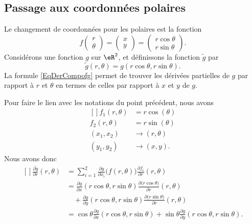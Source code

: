 \subsection{Passage aux coordonnées polaires}

Le changement de coordonnées pour les polaires est la fonction
\begin{equation}
    f\begin{pmatrix}
        r    \\ 
        \theta    
    \end{pmatrix}=\begin{pmatrix}
        x    \\ 
        y    
    \end{pmatrix}=\begin{pmatrix}
        r\cos\theta    \\ 
        r\sin\theta    
    \end{pmatrix}.
\end{equation}
Considérons une fonction $g$ sur $\eR^2$, et définissons la fonction $\tilde g$ par
\begin{equation}
    \tilde g(r,\theta)=g(r\cos\theta,r\sin\theta).
\end{equation}
La formule \eqref{EqDerCompofg} permet de trouver les dérivées partielles de $g$ par rapport à $r$ et $\theta$ en termes de celles par rapport à $x$ et $y$ de $g$.

Pour faire le lien avec les notations du point précédent, nous avons
\begin{equation}
    \begin{aligned}[]
        f_1(r,\theta)&=r\cos(\theta)\\
        f_2(r,\theta)&=r\sin(\theta)\\
        (x_1,x_2)&\to(r,\theta)\\
        (y_1,y_2)&\to(x,y).
    \end{aligned}
\end{equation}
Nous avons donc 
\begin{equation}
    \begin{aligned}[]
        \frac{ \partial \tilde g }{ \partial r }(r,\theta)&=\sum_{i=1}^2\frac{ \partial g }{ \partial x_i }\big( f(r,\theta) \big)\frac{ \partial f_i }{ \partial r }(r,\theta)\\
        &=\frac{ \partial g }{ \partial x }(r\cos\theta,r\sin\theta)\frac{ \partial \big( r\cos\theta \big) }{ \partial r }(r,\theta)\\
        &\quad+\frac{ \partial g }{ \partial y }(r\cos\theta,r\sin\theta)\frac{ \partial \big( r\sin\theta\big) }{ \partial r }(r,\theta)\\
        &=\cos\theta\frac{ \partial g }{ \partial x }(r\cos\theta,r\sin\theta)+\sin\theta\frac{ \partial g }{ \partial y }(r\cos\theta,r\sin\theta).
    \end{aligned}
\end{equation}

